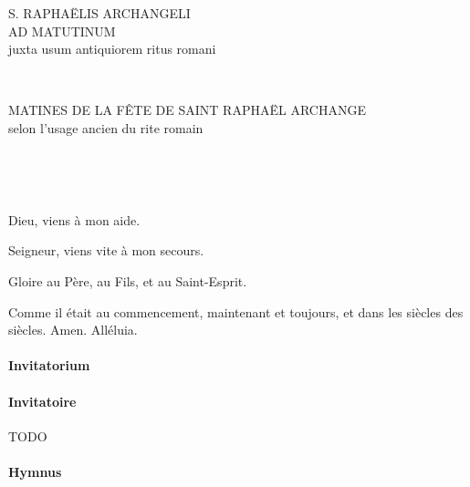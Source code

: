 \documentclass[twoside]{article}
\begin{document}
\null \newpage

\sloppy

\begin{paracol}[1]{2}

\begin{center}\begin{doublespace}

{
\MakeUppercase{\Large S. Raphaëlis Archangeli \\ ad Matutinum}\\
juxta usum antiquiorem ritus romani}
\end{doublespace}\end{center}


~~

\switchcolumn

\begin{center}\begin{doublespace}
{
\MakeUppercase{\Large Matines de la fête de Saint Raphaël Archange}\\
selon l'usage ancien du rite romain}
\end{doublespace}\end{center}

~~

~~

\vv Dieu, viens à mon aide.

\rr Seigneur, viens vite à mon secours.

\vv Gloire au Père, au Fils, et au Saint-Esprit.

\rr Comme il était au commencement, maintenant et toujours, et dans les siècles des siècles. Amen. Alléluia.

\switchcolumn*

\paragraph{Invitatorium}


\switchcolumn

\paragraph{Invitatoire}

TODO

\switchcolumn*

\paragraph{Hymnus}


\end{paracol}
\end{document}
